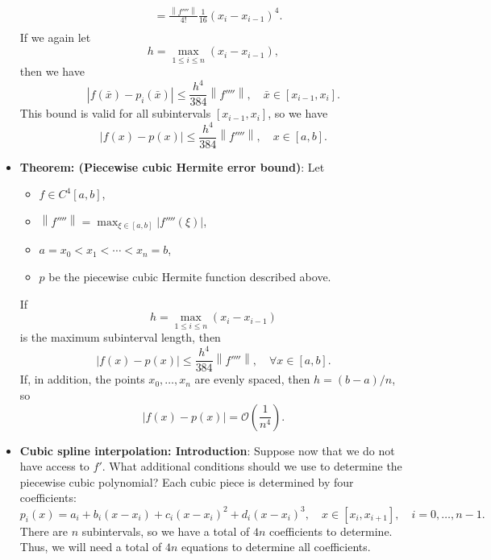 \documentclass{report}
\begin{document}
\begin{itemize}
\begin{align*}
& = \frac{\left\|f''''\right\|}{4!} \frac{1}{16}(x_i - x_{i-1})^4.\\
            \end{align*}
            If we again let 
            $$h = \max_{1 \leq i \leq n} (x_i - x_{i-1}),$$
            then we have 
            $$
            \left|f(\bar x) - p_i(\bar x)\right| \leq \frac{h^4}{384} \left\|f''''\right\|, 
            \quad \bar x \in [x_{i-1}, x_i].
            $$
            This bound is valid for all subintervals $[x_{i-1}, x_i]$, so we have
            $$
            \left|f(x) - p(x)\right| \leq \frac{h^4}{384} \left\|f''''\right\|, 
            \quad x \in [a, b].
            $$
        \item \textbf{Theorem: (Piecewise cubic Hermite error bound)}:
             Let 
             \begin{itemize}
                 \item $f \in C^4[a,b]$,
                 \item $\left\|f''''\right\| = \max_{\xi \in [a,b]} \left|f''''(\xi)\right|$,
                 \item $a = x_0 < x_1 < \cdots < x_n = b$,
                 \item $p$ be the piecewise cubic Hermite function described above.
             \end{itemize}
             If
             $$h = \max_{1 \leq i \leq n} (x_i - x_{i-1})$$
             is the maximum subinterval length, then
             $$\left|f(x) - p(x)\right| \leq \frac{h^4}{384} \left\|f''''\right\|, \quad \forall x \in [a,b].$$
             If, in addition, the points $x_0,\ldots,x_n$ are evenly spaced, then $h = (b-a)/n$, so
             $$\left|f(x) - p(x)\right| = \mathcal{O}\left(\frac{1}{n^4}\right).$$
        \item \textbf{Cubic spline interpolation: Introduction}:
            Suppose now that we do not have access to $f'$.
            \bigbreak \noindent 
            What additional conditions should we use to determine the piecewise cubic polynomial?
            \bigbreak \noindent 
            Each cubic piece is determined by four coefficients:
            \bigbreak \noindent 
            $$p_i(x) = a_i + b_i(x-x_i) + c_i(x-x_i)^2 + d_i(x-x_i)^3, \quad x \in [x_i,x_{i+1}], \quad i=0,\ldots,n-1.$$
            \bigbreak \noindent 
            There are $n$ subintervals, so we have a total of $4n$ coefficients to determine.
            \bigbreak \noindent 
            Thus, we will need a total of $4n$ equations to determine all coefficients.

\end{itemize}
\end{document}
